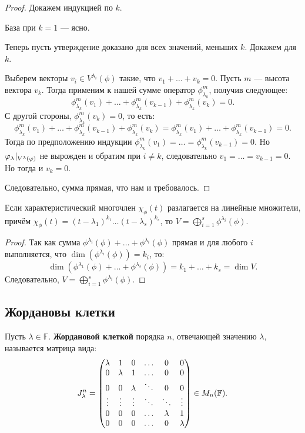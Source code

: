 \begin{proof}
	Докажем индукцией по $k$.
	
	База при $k = 1$ --- ясно.
	
	Теперь пусть утверждение доказано для всех значений, меньших $k$. Докажем для $k$.
	
	Выберем векторы $v_i \in V^{\lambda_i}(\phi)$ такие, что $v_1 + \ldots + v_k = 0$. Пусть $m$ --- высота вектора $v_k$. Тогда применим к нашей сумме оператор $\phi^m_{\lambda_k}$, получив следующее:
	\[
	\phi^m_{\lambda_k}(v_1) + \ldots + \phi^m_{\lambda_k}(v_{k-1}) + \phi^m_{\lambda_k}(v_k) = 0.
	\]
	С другой стороны, $ \phi^m_{\lambda_k}(v_k) = 0$, то есть:
	\[
	\phi^m_{\lambda_k}(v_1) + \ldots + \phi^m_{\lambda_k}(v_{k-1}) + \phi^m_{\lambda_k}(v_k) = \phi^m_{\lambda_k}(v_1) + \ldots + \phi^m_{\lambda_k}(v_{k-1}) = 0.
	\]
	Тогда по предположению индукции $\phi^m_{\lambda_k}(v_1) = \ldots = \phi^m_{\lambda_k}(v_{k-1}) = 0$. Hо
	$ {\varphi_\lambda}\negmedspace\mid_{V^\lambda(\varphi)}$ не вырожден и обратим при $i \neq k$, следовательно $v_1 = \ldots = v_{k-1} = 0$. Но тогда и $v_k = 0$. 
	
	Следовательно, сумма прямая, что нам и требовалось.
\end{proof}

\begin{Theorem}
	Если характеристический многочлен $\chi_\phi(t)$ разлагается на линейные множители, причём $\chi_\phi(t) = (t - \lambda_1)^{k_1}\ldots(t - \lambda_s)^{k_s}$, то $V = \bigoplus_{i = 1}^s  \phi^{\lambda_i}(\phi)$.
\end{Theorem}

\begin{proof}
	Так как сумма $ \phi^{\lambda_i}(\phi) + \ldots +  \phi^{\lambda_i}(\phi)$ прямая и для любого $i$ выполняется, что $\dim(\phi^{\lambda_i}(\phi)) = k_i$, то: 
	$$
	\dim(\phi^{\lambda_1}(\phi) + \ldots +  \phi^{\lambda_s}(\phi)) = k_1 + \ldots + k_s = \dim{V}.
	$$
	Следовательно, $V = \bigoplus_{i = 1}^s  \phi^{\lambda_i}(\phi)$.
\end{proof}

\subsection{Жордановы клетки}
\begin{Def}
Пусть $\lambda \in \mathbb{F}$. \textbf{Жордановой клеткой} порядка $n$, отвечающей значению $\lambda$, называется матрица вида:
\begin{gather*}
J_\lambda^n = 
\begin{pmatrix}
\lambda & 1 & 0 & \ldots & 0 & 0 \\
0 & \lambda & 1 & \ldots & 0 & 0 \\
0 & 0 & \lambda & \ddots & 0 & 0 \\
\vdots & \vdots & \vdots & \ddots & \ddots & \vdots \\
0 & 0 & 0 & \ldots & \lambda & 1 \\
0 & 0 & 0 & \ldots & 0 & \lambda
\end{pmatrix} \in M_n(\mathbb{F}).
\end{gather*}
\end{Def}

